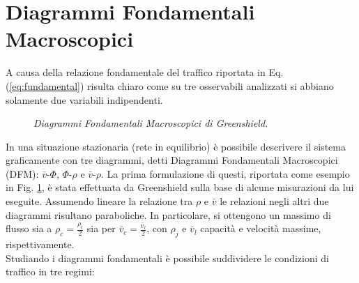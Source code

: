\documentclass[../main.tex]{subfiles}
\begin{document}
\section{Diagrammi Fondamentali Macroscopici}
A causa della relazione fondamentale del traffico riportata in Eq. (\ref{eq:fundamental}) risulta chiaro come su tre osservabili analizzati si abbiano solamente due variabili indipendenti.
\begin{figure}[H]
\centering
{}
\caption[DFM di Greenshield]{\emph{Diagrammi Fondamentali Macroscopici di Greenshield.}}
\label{fig:greenshield}
\end{figure}
In una situazione stazionaria (rete in equilibrio) \`e possibile descrivere il sistema graficamente con tre diagrammi, detti Diagrammi Fondamentali Macroscopici (DFM): $\bar{v}$-$\Phi$, $\Phi$-$\rho$ e $\bar{v}$-$\rho$.
La prima formulazione di questi, riportata come esempio in Fig. \ref{fig:greenshield}, \`e stata effettuata da Greenshield sulla base di alcune misurazioni da lui eseguite.
Assumendo lineare la relazione tra $\rho$ e $\bar{v}$ le relazioni negli altri due diagrammi risultano paraboliche.
In particolare, si ottengono un massimo di flusso sia a $\rho_c=\frac{\rho_t}{2}$ sia per $\bar{v}_c=\frac{\bar{v}_l}{2}$, con $\rho_j$ e $\bar{v}_l$ capacit\`a e velocit\`a massime, rispettivamente.
\\Studiando i diagrammi fondamentali \`e possibile suddividere le condizioni di traffico in tre regimi:
\end{document}
